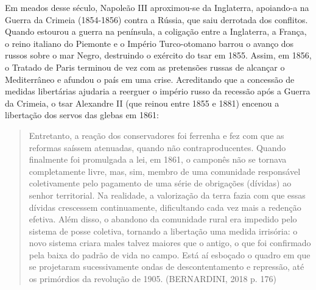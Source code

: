\documentclass{article}
\begin{document}
Em meados desse século, Napoleão III aproximou-se da Inglaterra,
apoiando-a na Guerra da Crimeia (1854-1856) contra a Rússia, que saiu
derrotada dos conflitos. Quando estourou a guerra na península, a
coligação entre a Inglaterra, a França, o reino italiano do Piemonte e o
Império Turco-otomano barrou o avanço dos russos sobre o mar Negro,
destruindo o exército do tsar em 1855. Assim, em 1856, o Tratado de
Paris terminou de vez com as pretensões russas de alcançar o
Mediterrâneo e afundou o país em uma crise. Acreditando que a concessão
de medidas libertárias ajudaria a reerguer o império russo da recessão
após a Guerra da Crimeia, o tsar Alexandre II (que reinou entre 1855 e
1881) encenou a libertação dos servos das glebas em 1861:

\begin{quote}
Entretanto, a reação dos conservadores foi ferrenha e fez com que as
reformas saíssem atenuadas, quando não contraproducentes. Quando
finalmente foi promulgada a lei, em 1861, o camponês não se tornava
completamente livre, mas, sim, membro de uma comunidade responsável
coletivamente pelo pagamento de uma série de obrigações (dívidas) ao
senhor territorial. Na realidade, a valorização da terra fazia com que
essas dívidas crescessem continuamente, dificultando cada vez mais a
redenção efetiva. Além disso, o abandono da comunidade rural era
impedido pelo sistema de posse coletiva, tornando a libertação uma
medida irrisória: o novo sistema criara males talvez maiores que o
antigo, o que foi confirmado pela baixa do padrão de vida no campo. Está
aí esboçado o quadro em que se projetaram sucessivamente ondas de
descontentamento e repressão, até os primórdios da revolução de 1905.
(BERNARDINI, 2018 p. 176)
\end{quote}
\end{document}
